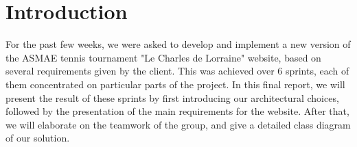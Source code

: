 \section{Introduction}
\label{sec:Introduction}


For the past few weeks, we were asked to develop and implement a new version of the ASMAE tennis tournament "Le Charles de Lorraine" website, based on several requirements given by the client. This was achieved over 6 sprints, each of them concentrated on particular parts of the project. In this final report, we will present the result of these sprints by first introducing our architectural choices, followed by the presentation of the main requirements for the website. After that, we will elaborate on the teamwork of the group, and give a detailed class diagram of our solution.  